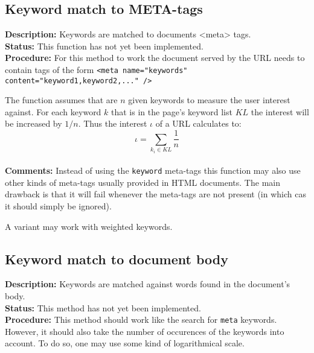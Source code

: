 \documentclass[a4paper]{danarticle}
\begin{document}
     \subsection*{Keyword match to META-tags}
       \textbf{Description:} Keywords are matched to documents <meta> tags.
       \\
       \textbf{Status:} This function has not yet been implemented.
       \\
       \textbf{Procedure:} For this method to work the document served by
       the URL needs to contain tags of the form 
       \verb!<meta name="keywords" content="keyword1,keyword2,..." />!
       
       The function assumes that are $ n $ given keywords to measure the
       user interest against. For each keyword $ k $ that is in the 
       page's keyword list $ KL $ the interest will be increased by 
       $ 1/n $. Thus the interest $ \iota $ of a URL calculates to:
       \[
       	  \iota = \sum_{k_i \in KL} \frac{1}{n}
       \]
       \\
       \textbf{Comments:} Instead of using the \verb!keyword! meta-tags this
       function may also use other kinds of meta-tags usually provided in HTML
       documents. The main drawback is that it will fail whenever the meta-tags
       are not present (in which cas it should simply be ignored).
       
       A variant may work with weighted keywords.
     \subsection*{Keyword match to document body}
       \textbf{Description:} Keywords are matched against words found in
       the document's body. 
       \\
       \textbf{Status:} This method has not yet been implemented.
       \\
       \textbf{Procedure:} This method should work like the search for
       \verb!meta! keywords. However, it should also take the number of
       occurences of the keywords into account. To do so, one may use some
       kind of logarithmical scale.
       
\end{document}
